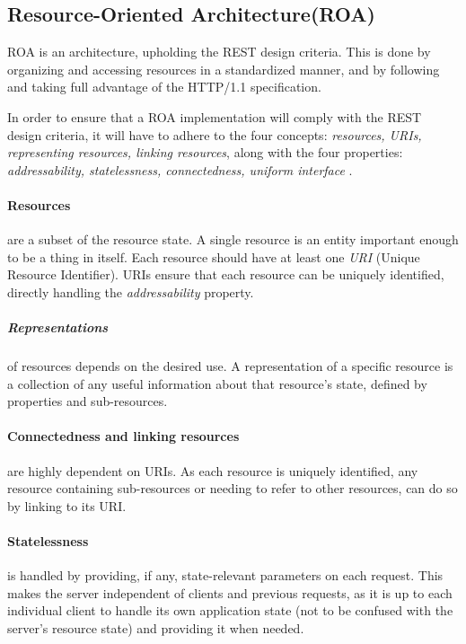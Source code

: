 \subsection{Resource-Oriented Architecture(ROA)}\label{webservice:roa}
ROA is an architecture, upholding the REST design criteria.
This is done by organizing and accessing resources in a standardized manner, and by following and taking full advantage of the HTTP/1.1 specification.

In order to ensure that a ROA implementation will comply with the REST design criteria, it will have to adhere to the four concepts: \textit{resources, URIs, representing resources, linking resources}, along with the four properties: \textit{addressability, statelessness, connectedness, uniform interface} \cite[Chapter 4]{restful_web_services}.

\paragraph{Resources} are a subset of the resource state.
A single resource is an entity important enough to be a thing in itself.
Each resource should have at least one \textit{URI} (Unique Resource Identifier).
URIs ensure that each resource can be uniquely identified, directly handling the \textit{addressability} property.

\subparagraph{Representations} of resources depends on the desired use.
A representation of a specific resource is a collection of any useful information about that resource's state, defined by properties and sub-resources.

\paragraph{Connectedness and linking resources} are highly dependent on URIs.
As each resource is uniquely identified, any resource containing sub-resources or needing to refer to other resources, can do so by linking to its URI.

\paragraph{Statelessness} is handled by providing, if any, state-relevant parameters on each request.
This makes the server independent of clients and previous requests, as it is up to each individual client to handle its own application state (not to be confused with the server's resource state) and providing it when needed.

